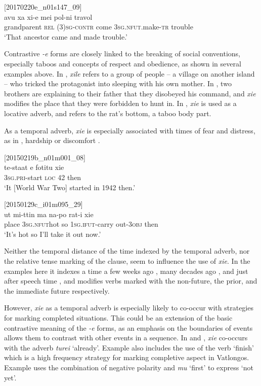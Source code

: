 \documentclass[output=paper,colorlinks,citecolor=brown]{langscibook}
\begin{document}
\ea
{\label{ex:ridge:45}[20170220e\_n01s147\_09]}\\
\gll avu    xa  xi-e    mei      pol-ni      travol\\
     grandparent   \textsc{rel}   \textsc{(3)sg-contr} come \textsc{3sg.nfut.}make-\textsc{tr} trouble\\
\glt ‘That ancestor came and made trouble.’
\z

Contrastive \textit{-e} forms are closely linked to the breaking of social conventions, especially taboos and concepts of respect and obedience, as shown in several examples above. In , \textit{xile} refers to a group of people – a village on another island – who tricked the protagonist into sleeping with his own mother. In , two brothers are explaining to their father that they disobeyed his command, and \textit{xie} modifies the place that they were forbidden to hunt in. In , \textit{xie} is used as a locative adverb, and refers to the rat’s bottom, a taboo body part.

As a temporal adverb, \textit{xie} is especially associated with times of fear and distress, as in , hardship  or discomfort .

\ea
{\label{ex:ridge:46}[20150219b\_n01m001\_08]}\\
\gll te-staat    e  fotitu  xie\\
     \textsc{3sg.pri}-start  \textsc{loc}  42  then\\
\glt ‘It [World War Two] started in 1942 then.’
\z

\ea
{\label{ex:ridge:47}[20150129c\_i01m095\_29]}\\
\gll ut   mi-ttin     ma  na-po        rat-i    xie\\
     place   \textsc{3sg.nfut}hot   so   \textsc{1sg.ifut-}carry   out-\textsc{3obj}   then\\
\glt ‘It’s hot so I’ll take it out now.’
\z

Neither the temporal distance of the time indexed by the temporal adverb, nor the relative tense marking of the clause, seem to influence the use of \textit{xie}. In the examples here it indexes a time a few weeks ago , many decades ago , and just after speech time , and modifies verbs marked with the non-future, the prior, and the immediate future respectively.

However, \textit{xie} as a temporal adverb is especially likely to co-occur with strategies for marking completed situations. This could be an extension of the basic contrastive meaning of the \textit{-e} forms, as an emphasis on the boundaries of events allows them to contrast with other events in a sequence. In  and , \textit{xie} co-occurs with the adverb \textit{turei} ‘already’. Example  also includes the use of the verb ‘finish’ which is a high frequency strategy for marking completive aspect in Vatlongos. Example  uses the combination of negative polarity and \textit{mu} ‘first’ to express ‘not yet’.
\end{document}
